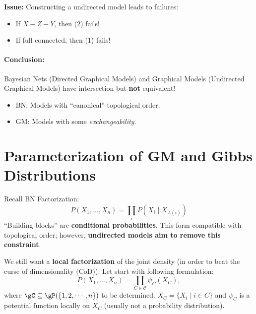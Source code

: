 \documentclass{article}%
\begin{document}
\textbf{Issue:} Constructing a undirected model leads to failures:
\begin{itemize}
    \item If \( X - Z - Y \), then (2) fails!
    \item If full connected, then (1) fails!
\end{itemize}

\paragraph{Conclusion:} Bayesian Nets (Directed Graphical Models) and Graphical Models (Undirected Graphical Models) have intersection but \textbf{not} equivalent!
\begin{itemize}
    \item BN: Models with ``canonical'' topological order.
    \item GM: Models with some \textit{exchangeability}.
\end{itemize}

\section{Parameterization of GM and Gibbs Distributions}

Recall BN Factorization:
\[
P(X_1, \dots, X_n) = \prod_i P(X_i \mid X_{A(i)})
\]
``Building blocks'' are \textbf{conditional probabilities}. This form compatible with topological order; however, \textbf{undirected models aim to remove this constraint}.

We still want a \textbf{local factorization} of the joint density (in order to beat the curse of dimensionality (CoD)). Let start with following formulation:
\[
P(X_1, \dots, X_n) = \prod_{C \in \mathcal{C}} \psi_C (X_C),
\]
where $\gC \subseteq \gP(\{1,2,\cdots,n\})$ to be determined. 
\(
X_C = \{X_i \mid i \in C\}
\) and $\psi_C$ is a potential function locally on $X_C$ (usually not a probability distribution).
\end{document}
